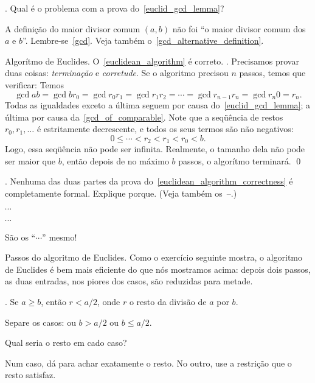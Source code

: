 \exercise.
Qual é o problema com a prova do~\ref{euclid_gcd_lemma}?

\solution
A definição do maior divisor comum $(a,b)$ não foi ``o maior divisor comum dos $a$ e $b$''.
Lembre-se~\ref{gcd}.  Veja também o~\ref{gcd_alternative_definition}.

\endexercise

\theorem Algorítmo de Euclides.
\label{euclidean_algorithm_correctness}
O~\ref{euclidean_algorithm} é correto.
\proof.
Precisamos provar duas coisas: \emph{terminação\/}\/ e \emph{corretude}.
\endgraf
{}
Se o algoritmo precisou $n$ passos, temos que verificar:
Temos
$$
\gcd a b
= \gcd b {r_0}
= \gcd {r_0} {r_1}
= \gcd {r_1} {r_2}
= \dotsb
= \gcd {r_{n-1}} {r_n}
= \gcd {r_n} 0
= r_n.
$$
Todas as igualdades exceto a última seguem por causa do~\ref{euclid_gcd_lemma};
a última por causa da~\ref{gcd_of_comparable}.
\endgraf
{}
Note que a seqüência de restos $r_0, r_1, \ldots$ é estritamente
decrescente, e todos os seus termos são não negativos:
$$
0\leq \dotsb < r_2 < r_1 < r_0 < b.
$$
Logo, essa seqüência não pode ser infinita.
Realmente, o tamanho dela não pode ser maior que $b$,
então depois de no máximo $b$ passos, o algorítmo terminará.
\qed

\exercise.
\label{euclidean_algorithm_proof_why_informal}
Nenhuma das duas partes da prova do~\ref{euclidean_algorithm_correctness}
é completamente formal.  Explique porque.
(Veja também os~--.)

\hint ${}\dotsb{}$

\hint ${}\dotsb{}$

\solution
São os ``${}\dotsb{}$'' mesmo!

\endexercise

\note Passos do algoritmo de Euclides.
Como o exercício seguinte mostra, o algoritmo de Euclides
é bem mais eficiente do que nós mostramos acima:
depois dois passos, as duas entradas, nos piores dos casos,
são reduzidas para metade.

\exercise.
Se $a \geq b$, então $r < a/2$, onde $r$ o resto da divisão de $a$ por $b$.

\hint Separe os casos: ou $b > a/2$ ou $b \leq a/2$.

\hint Qual seria o resto em cado caso?

\hint Num caso, dá para achar exatamente o resto.
No outro, use a restrição que o resto satisfaz.

